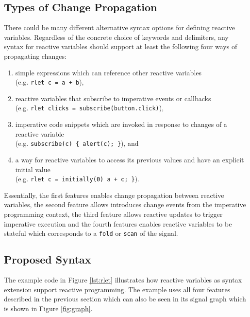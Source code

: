 \documentclass{sig-alternate-05-2015}
\begin{document}
\subsection{Types of Change Propagation}
\label{ssec:req}

There could be many different alternative syntax options for defining reactive variables.  Regardless of the concrete choice of keywords and delimiters, any syntax for reactive variables should support at least the following four ways of propagating changes:

\begin{enumerate}
  \item simple expressions which can reference other reactive variables \\ (e.g. \lstinline|rlet c = a + b|),
  \item reactive variables that subscribe to imperative events or callbacks \\ (e.g. \lstinline|rlet clicks = subscribe(button.click)|),
  \item imperative code snippets which are invoked in response to changes of a reactive variable \\ (e.g. \lstinline|subscribe(c) { alert(c); }|), and
  \item a way for reactive variables to access its previous values and have an explicit initial value \\ (e.g. \lstinline|rlet c = initially(0) a + c; }|).
\end{enumerate}

Essentially, the first features enables change propagation between reactive variables, the second feature allows introduces change events from the imperative programming context, the third feature allows reactive updates to trigger imperative execution and the fourth features enables reactive variables to be stateful which corresponds to a \lstinline+fold+ or \lstinline+scan+ of the signal.

\subsection{Proposed Syntax}

The example code in Figure \ref{lst:rlet} illustrates how reactive variables as syntax extension support reactive programming.  The example uses all four features described in the previous section which can also be seen in its signal graph which is shown in Figure \ref{fig:graph}.
\end{document}
